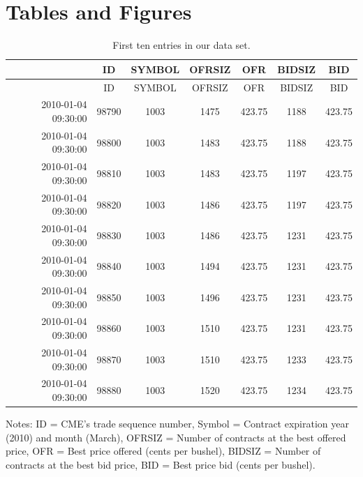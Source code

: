 \documentclass[10pt,review]{elsarticle}
\date{}
\begin{document}
\section{Tables and Figures}\label{tables-and-figures}

\begin{longtable}[c]{@{}rcccccc@{}}
\caption{First ten entries in our data set.}\tabularnewline
\toprule
& ID & SYMBOL & OFRSIZ & OFR & BIDSIZ & BID\tabularnewline
\midrule
\endfirsthead
\toprule
& ID & SYMBOL & OFRSIZ & OFR & BIDSIZ & BID\tabularnewline
\midrule
\endhead
2010-01-04 09:30:00 & 98790 & 1003 & 1475 & 423.75 & 1188 &
423.75\tabularnewline
2010-01-04 09:30:00 & 98800 & 1003 & 1483 & 423.75 & 1188 &
423.75\tabularnewline
2010-01-04 09:30:00 & 98810 & 1003 & 1483 & 423.75 & 1197 &
423.75\tabularnewline
2010-01-04 09:30:00 & 98820 & 1003 & 1486 & 423.75 & 1197 &
423.75\tabularnewline
2010-01-04 09:30:00 & 98830 & 1003 & 1486 & 423.75 & 1231 &
423.75\tabularnewline
2010-01-04 09:30:00 & 98840 & 1003 & 1494 & 423.75 & 1231 &
423.75\tabularnewline
2010-01-04 09:30:00 & 98850 & 1003 & 1496 & 423.75 & 1231 &
423.75\tabularnewline
2010-01-04 09:30:00 & 98860 & 1003 & 1510 & 423.75 & 1231 &
423.75\tabularnewline
2010-01-04 09:30:00 & 98870 & 1003 & 1510 & 423.75 & 1233 &
423.75\tabularnewline
2010-01-04 09:30:00 & 98880 & 1003 & 1520 & 423.75 & 1234 &
423.75\tabularnewline
\bottomrule
\end{longtable}

Notes: ID = CME's trade sequence number, Symbol = Contract expiration
year (2010) and month (March), OFRSIZ = Number of contracts at the best
offered price, OFR = Best price offered (cents per bushel), BIDSIZ =
Number of contracts at the best bid price, BID = Best price bid (cents
per bushel).

\clearpage
\end{document}
